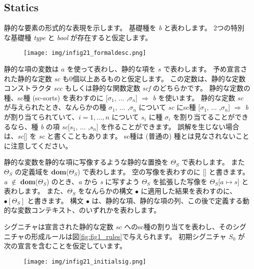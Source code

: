 \documentclass[submit,techreq,noauthor,onecolumn]{ipsj}
\begin{document}
\subsection{Statics}

静的な要素の形式的な表現を示します。
基礎種を {\it b} と表わします。
2つの特別な基礎種 {\it type} と {\it bool} が存在すると仮定します。

\begin{figure}[h]
\centering
\texttt{[image: img/infig21\_formaldesc.png]}
\end{figure}

\noindent 静的な項の変数は $a$ を使って表わし、静的な項を $s$ で表わします。
予め宣言された静的な定数 {\it sc} も0個以上あるものと仮定します。
この定数は、静的な定数コンストラクタ {\it scc} もしくは静的な関数定数 {\it scf} のどちらかです。
静的な定数の種、sc種 (sc-sorts) を表わすのに [$\sigma_1$, $\ldots$ ,$\sigma_n$] $\Rightarrow$ {\it b} を使います。
静的な定数 {\it sc} が与えられたとき、なんらかの種 $\sigma_1$, $\ldots$ ,$\sigma_n$ について {\it sc} にsc種 [$\sigma_1$, $\ldots$ ,$\sigma_n$] $\Rightarrow$ {\it b} が割り当てられていて、$i = 1, \ldots ,n$ について $s_i$ に種 $\sigma_i$ を割り当てることができるなら、種 {\it b} の項 {\it sc}[$s_1$, $\ldots$ ,$s_n$] を作ることができます。
誤解を生じない場合は、{\it sc}[] を {\it sc} と書くこともあります。
sc種は (普通の) 種とは見なされないことに注意してください。

静的な変数を静的な項に写像するような静的な置換を $\Theta_S$ で表わします。
また $\Theta_S$ の定義域を {\bf dom}($\Theta_S$) で表わします。
空の写像を表わすのに [] と書きます。
{\it a} $\notin$ {\bf dom}($\Theta_S$) のとき、{\it a} から {\it s} に写すよう $\Theta_S$ を拡張した写像を $\Theta_S$[$a \mapsto s$] と表わします。
また、$\Theta_S$ をなんらかの構文 $\bullet$ に適用した結果を表わすのに、$\bullet[\Theta_S]$ と書きます。
構文 $\bullet$ は、静的な項、静的な項の列、この後で定義する動的な変数コンテキスト、のいずれかを表わします。

シグニチャは宣言された静的な定数 $sc$ へのsc種の割り当てを表わし、そのシグニチャの形成ルールは図\ref{fig:fig1_rules}で与えられます。
初期シグニチャ $S_0$ が次の宣言を含むことを仮定しています。

\begin{figure}[h]
\centering
\texttt{[image: img/infig21\_initialsig.png]}
\end{figure}
\end{document}
